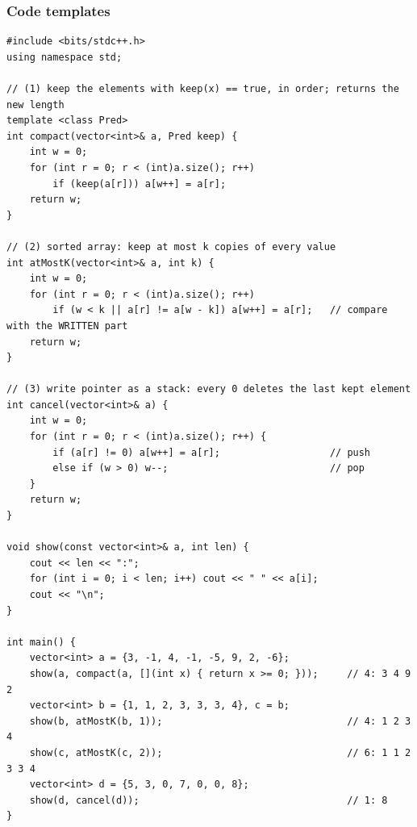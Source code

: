 \begin{diagrambox}
\end{diagrambox}

\subsubsection*{Code templates}

\begin{lstlisting}[style=cpp]
#include <bits/stdc++.h>
using namespace std;

// (1) keep the elements with keep(x) == true, in order; returns the new length
template <class Pred>
int compact(vector<int>& a, Pred keep) {
    int w = 0;
    for (int r = 0; r < (int)a.size(); r++)
        if (keep(a[r])) a[w++] = a[r];
    return w;
}

// (2) sorted array: keep at most k copies of every value
int atMostK(vector<int>& a, int k) {
    int w = 0;
    for (int r = 0; r < (int)a.size(); r++)
        if (w < k || a[r] != a[w - k]) a[w++] = a[r];   // compare with the WRITTEN part
    return w;
}

// (3) write pointer as a stack: every 0 deletes the last kept element
int cancel(vector<int>& a) {
    int w = 0;
    for (int r = 0; r < (int)a.size(); r++) {
        if (a[r] != 0) a[w++] = a[r];                   // push
        else if (w > 0) w--;                            // pop
    }
    return w;
}

void show(const vector<int>& a, int len) {
    cout << len << ":";
    for (int i = 0; i < len; i++) cout << " " << a[i];
    cout << "\n";
}

int main() {
    vector<int> a = {3, -1, 4, -1, -5, 9, 2, -6};
    show(a, compact(a, [](int x) { return x >= 0; }));     // 4: 3 4 9 2
    vector<int> b = {1, 1, 2, 3, 3, 3, 4}, c = b;
    show(b, atMostK(b, 1));                                // 4: 1 2 3 4
    show(c, atMostK(c, 2));                                // 6: 1 1 2 3 3 4
    vector<int> d = {5, 3, 0, 7, 0, 0, 8};
    show(d, cancel(d));                                    // 1: 8
}
\end{lstlisting}

